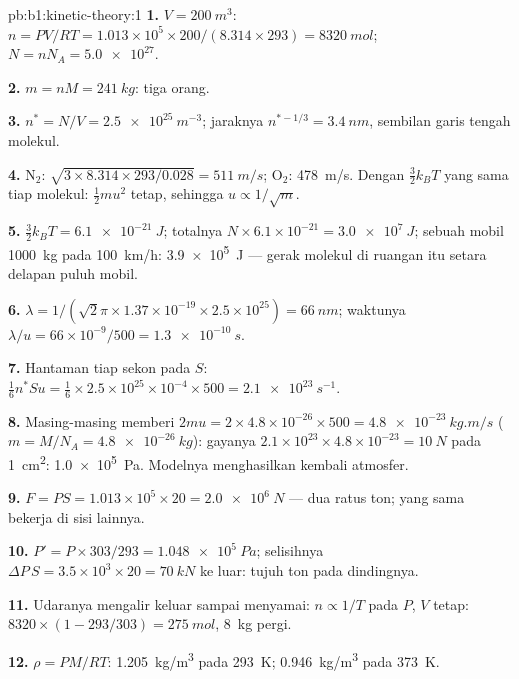 \begin{solution}{pb:b1:kinetic-theory:1}
\textbf{1.} $V = \qty{200}{m^3}$: $n = PV/RT = 1.013\times10^5 \times 200/(8.314
\times 293) = \qty{8320}{mol}$; $N = nN_A = \num{5.0e27}$.

\textbf{2.} $m = nM = \qty{241}{kg}$: tiga orang.

\textbf{3.} $n^* = N/V = \qty{2.5e25}{m^{-3}}$; jaraknya $n^{*-1/3} = \qty{3.4}{nm}$,
sembilan garis tengah molekul.

\textbf{4.} N$_2$: $\sqrt{3 \times 8.314 \times 293/0.028} = \qty{511}{m/s}$;
O$_2$: \qty{478}{m/s}. Dengan $\tfrac32 k_BT$ yang sama tiap molekul: $\tfrac12 mu^2$ tetap,
sehingga $u \propto 1/\sqrt m$.

\textbf{5.} $\tfrac32 k_BT = \qty{6.1e-21}{J}$; totalnya $N \times 6.1\times10^{-21}
= \qty{3.0e7}{J}$; sebuah mobil \qty{1000}{kg} pada \qty{100}{km/h}: \qty{3.9e5}{J} ---
gerak molekul di ruangan itu setara delapan puluh mobil.

\textbf{6.} $\lambda = 1/(\sqrt2\pi \times 1.37\times10^{-19} \times 2.5\times10^{25})
= \qty{66}{nm}$; waktunya $\lambda/u = 66\times10^{-9}/500 = \qty{1.3e-10}{s}$.

\textbf{7.} Hantaman tiap sekon pada $S$: $\tfrac16 n^*Su = \tfrac16 \times 2.5\times
10^{25} \times 10^{-4} \times 500 = \qty{2.1e23}{s^{-1}}$.

\textbf{8.} Masing-masing memberi $2mu = 2 \times 4.8\times10^{-26} \times 500 = \qty{4.8e-23}{kg.m/s}$
($m = M/N_A = \qty{4.8e-26}{kg}$): gayanya $2.1\times10^{23} \times 4.8\times10^{-23}
= \qty{10}{N}$ pada \qty{1}{cm^2}: \qty{1.0e5}{Pa}. Modelnya menghasilkan kembali
 atmosfer.

\textbf{9.} $F = PS = 1.013\times10^5 \times 20 = \qty{2.0e6}{N}$ --- dua ratus
ton;  yang sama bekerja di sisi lainnya.

\textbf{10.} $P' = P \times 303/293 = \qty{1.048e5}{Pa}$; selisihnya $\Delta P\,S = 3.5
\times10^3 \times 20 = \qty{70}{kN}$ ke luar: tujuh ton pada dindingnya.

\textbf{11.} Udaranya mengalir keluar sampai  menyamai: $n \propto 1/T$ pada
$P$, $V$ tetap: $8320 \times (1 - 293/303) = \qty{275}{mol}$, \qty{8}{kg}
pergi.

\textbf{12.} $\rho = PM/RT$: \qty{1.205}{kg/m^3} pada \qty{293}{K}; \qty{0.946}{kg/m^3}
pada \qty{373}{K}.


\end{solution}
